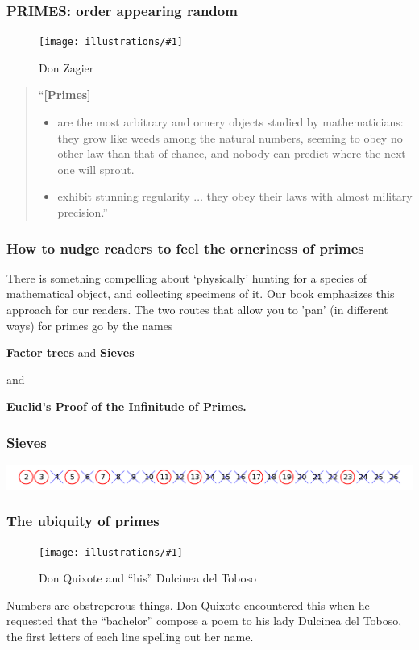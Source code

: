 \documentclass{beamer}
\newcommand{\ill}[3]{%
   \begin{figure}[H]%
   \vspace{-2ex}
   \centering%
   \texttt{[image: illustrations/\#1]}%
   \caption{#3}%
   \vspace{-2ex}
    \end{figure}}
\newcommand{\illtwo}[4]{%
   \begin{figure}[H]\centering%
   \texttt{[image: illustrations/\#1]}$\qquad$\texttt{[image: illustrations/\#2]}%
   \caption{#4}%
    \end{figure}}
\begin{document}
\begin{frame}\frametitle{PRIMES: order appearing random }
\vskip10pt
\ill{zagier}{.15}{Don Zagier}


\begin{quote}

``{\bf [Primes]}
\begin{itemize}\item are the most arbitrary and ornery objects studied by mathematicians:
  they grow like weeds among the natural numbers, seeming to obey no
  other law than that of chance, and nobody can predict where the next
  one will sprout. \item  exhibit stunning
  regularity $\dots$
  they obey their laws with almost military precision.''\end{itemize}
\end{quote}
\end{frame}

\begin{frame}\frametitle{How to nudge readers to feel the orneriness of primes }

 There is something compelling about `physically' hunting for a species of  mathematical object, and collecting specimens of it. Our book emphasizes this approach for our readers. The two routes that allow you to 'pan' (in different ways)  for  primes go by the names

\vskip20pt


\centerline{ {\bf Factor trees}  and {\bf Sieves}}


\vskip10pt


\centerline{and}


\vskip10pt


\centerline{\bf Euclid's Proof of the Infinitude of Primes.}
\end{frame}


\begin{frame}\frametitle{\bf Sieves}
\includegraphics[width=\textwidth]{illustrations/circled_primes}
\end{frame}

\begin{frame}\frametitle{\bf The ubiquity of primes}
\vskip10pt
\ill{dulcinea1}{.2}{Don Quixote and ``his'' Dulcinea del Toboso}
\vskip10pt
Numbers are obstreperous things. Don Quixote encountered this when he
requested that the ``bachelor'' compose a poem to his lady Dulcinea del
Toboso, the first letters of each line spelling out her name.
\end{frame}
\end{document}
